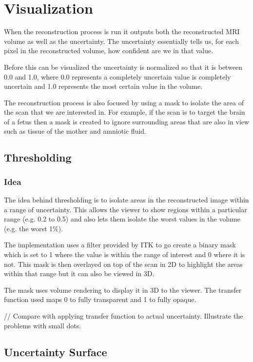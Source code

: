 \chapter{Visualization}

When the reconstruction process is run it outputs both the reconstructed MRI volume as well as the uncertainty. The uncertainty essentially tells us, for each pixel in the reconstructed volume, how confident are we in that value.

Before this can be visualized the uncertainty is normalized so that it is between 0.0 and 1.0, where 0.0 represents a completely uncertain value is completely uncertain and 1.0 represents the most certain value in the volume.

The reconstruction process is also focused by using a mask to isolate the area of the scan that we are interested in. For example, if the scan is to target the brain of a fetus then a mask is created to ignore surrounding areas that are also in view such as tissue of the mother and amniotic fluid.

\section{Thresholding}\label{section:thresholding}

\subsection*{Idea}
The idea behind thresholding is to isolate areas in the reconstructed image within a range of uncertainty. This allows the viewer to show regions within a particular range (e.g. 0.2 to 0.5) and also lets them isolate the worst values in the volume (e.g. the worst 1$\%$).

The implementation uses a filter provided by ITK to go create a binary mask which is set to 1 where the value is within the range of interest and 0 where it is not. This mask is then overlayed on top of the scan in 2D to highlight the areas within that range but it can also be viewed in 3D.

The mask uses volume rendering to display it in 3D to the viewer. The transfer function used maps 0 to fully transparent and 1 to fully opaque.

// Compare with applying transfer function to actual uncertainty. Illustrate the problems with small dots.

\section{Uncertainty Surface}\label{section:uncertaintysurface}

